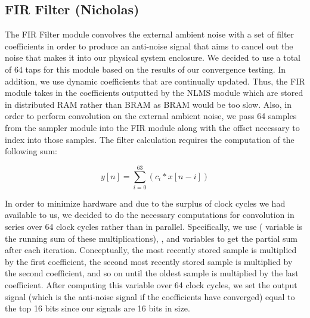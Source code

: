 \documentclass{fpgairpods}
\begin{document}
\subsection{FIR Filter (Nicholas)}
The FIR Filter module convolves the external ambient noise with a set of filter coefficients in order to produce an anti-noise signal that aims to cancel out the noise that makes it into our physical system enclosure. We decided to use a total of 64 taps for this module based on the results of our convergence testing. In addition, we use dynamic coefficients that are continually updated. Thus, the FIR module takes in the coefficients outputted by the NLMS module which are stored in distributed RAM rather than BRAM as BRAM would be too slow. Also, in order to perform convolution on the external ambient noise, we pass 64 samples from the sampler module into the FIR module along with the offset necessary to index into those samples. The filter calculation requires the computation of the following sum:

$$ y[n] = \sum_{i=0}^{63} (c_i * x[n-i]) $$

In order to minimize hardware and due to the surplus of clock cycles we had available to us, we decided to do the necessary computations for convolution in series over 64 clock cycles rather than in parallel. Specifically, we use  ( variable is the running sum of these multiplications), , and  variables to get the partial sum after each iteration. Conceptually, the most recently stored sample is multiplied by the first coefficient, the second most recently stored sample is multiplied by the second coefficient, and so on until the oldest sample is multiplied by the last coefficient. After computing this variable over 64 clock cycles, we set the output signal  (which is the anti-noise signal if the coefficients have converged) equal to the top 16 bits since our signals are 16 bits in size.
\end{document}
